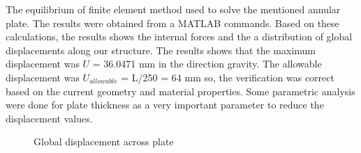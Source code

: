 The equilibrium of finite element method used to solve the mentioned annular
plate. The results were obtained from a MATLAB commands. Based on these
calculations, the results shows the internal forces and the a distribution of
global displacements along our structure. The results shows that the maximum
displacement was $U$ = 36.0471 mm in the direction gravity. The allowable
displacement was $U_{allowable}$ = L/250 = 64 mm so, the verification was correct
based on the current geometry and material properties. Some parametric analysis
were done for plate thickness as a very important parameter to reduce the
displacement values.

\begin{figure}[H]
    \centering
    
    \caption{ Global displacement across plate }
    \label{fig:UglobFull}
\end{figure}